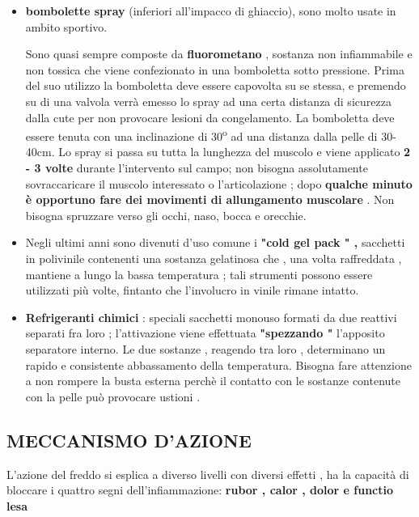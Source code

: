\begin{itemize}
\item
  \textbf{bombolette spray} (inferiori all'impacco di ghiaccio), sono
  molto usate in ambito sportivo.

Sono quasi sempre composte da \textbf{fluorometano} , sostanza non
infiammabile e non tossica che viene confezionato in una bomboletta
sotto pressione. Prima del suo utilizzo la bomboletta deve essere
capovolta su se stessa, e premendo su di una valvola verrà emesso lo
spray ad una certa distanza di sicurezza dalla cute per non provocare
lesioni da congelamento. La bomboletta deve essere tenuta con una
inclinazione di 30\textsuperscript{o}  ad una distanza dalla pelle di 30-40cm. Lo spray si
passa su tutta la lunghezza del muscolo e viene applicato \textbf{2 - 3
volte} durante l'intervento sul campo; non bisogna assolutamente
sovraccaricare il muscolo interessato o l'articolazione ; dopo
\textbf{qualche minuto è opportuno fare dei movimenti di allungamento
muscolare} . Non bisogna spruzzare verso gli occhi, naso, bocca e
orecchie.
 

\item
  Negli ultimi anni sono divenuti d'uso comune i \textbf{"cold gel pack
  " ,} sacchetti in polivinile contenenti una sostanza gelatinosa che ,
  una volta raffreddata , mantiene a lungo la bassa temperatura ; tali
  strumenti possono essere utilizzati più volte, fintanto che
  l'involucro in vinile rimane intatto.
\item
  \textbf{Refrigeranti chimici} : speciali sacchetti monouso formati da
  due reattivi separati fra loro ; l'attivazione viene effettuata
  \textbf{"spezzando "} l'apposito separatore interno. Le due sostanze ,
  reagendo tra loro , determinano un rapido e consistente abbassamento
  della temperatura. Bisogna fare attenzione a non rompere la busta
  esterna perchè il contatto con le sostanze contenute con la pelle può
  provocare ustioni .
\end{itemize}

 
\subsection{MECCANISMO D'AZIONE }


L'azione del freddo si esplica a diverso livelli con diversi effetti ,
ha la capacità di bloccare i quattro segni dell'infiammazione:
\textbf{rubor , calor , dolor e functio lesa}
 
